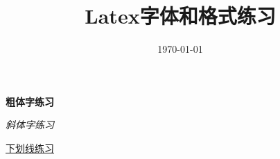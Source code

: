 \documentclass[UTF8]{article}
\title{Latex字体和格式练习}
\begin{document}
\date{\today}
\maketitle
\textbf{粗体字练习}

\textit{斜体字练习}

\underline{下划线练习}
\end{document}
